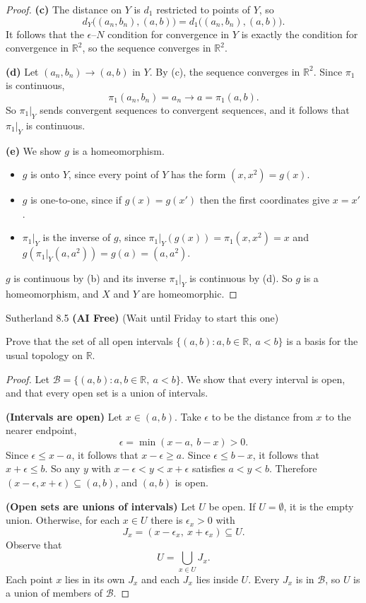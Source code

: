 \documentclass[minion]{homework}
\newcommand{\Reals}{\ensuremath{\mathbb R}}%
\begin{document}
\begin{problems}
\begin{proof}
\textbf{(c)} The distance on $Y$ is $d_1$ restricted to points of $Y$, so
\[
d_Y\big((a_n,b_n),(a,b)\big) = d_1\big((a_n,b_n),(a,b)\big).
\]
It follows that the $\epsilon$--$N$ condition for convergence in $Y$ is exactly the condition for convergence in $\Reals^2$, so the sequence converges in $\Reals^2$.

\textbf{(d)} Let $(a_n,b_n) \to (a,b)$ in $Y$. By (c), the sequence converges in $\Reals^2$. Since $\pi_1$ is continuous,
\[
\pi_1(a_n,b_n) = a_n \to a = \pi_1(a,b).
\]
So $\pi_1|_Y$ sends convergent sequences to convergent sequences, and it follows that $\pi_1|_Y$ is continuous.

\textbf{(e)} We show $g$ is a homeomorphism.
\begin{itemize}
  \item $g$ is onto $Y$, since every point of $Y$ has the form $(x,x^2) = g(x)$.
  \item $g$ is one-to-one, since if $g(x) = g(x')$ then the first coordinates give $x = x'$.
  \item $\pi_1|_Y$ is the inverse of $g$, since $\pi_1|_Y(g(x)) = \pi_1(x,x^2) = x$ and $g(\pi_1|_Y(a,a^2)) = g(a) = (a,a^2)$.
\end{itemize}
$g$ is continuous by (b) and its inverse $\pi_1|_Y$ is continuous by (d). So $g$ is a homeomorphism, and $X$ and $Y$ are homeomorphic.
\end{proof}

\problem Sutherland 8.5 \textbf{(AI Free)} (Wait until Friday to start this one)

Prove that the set of all open intervals $\{(a, b) : a, b \in \Reals,\ a < b\}$ is a basis for the usual topology on $\Reals$.

\begin{proof}
Let $\mathcal{B} = \{(a,b) : a, b \in \Reals,\ a < b\}$. We show that every interval is open, and that every open set is a union of intervals.

\textbf{(Intervals are open)} Let $x \in (a,b)$. Take $\epsilon$ to be the distance from $x$ to the nearer endpoint,
\[
\epsilon = \min(x - a,\ b - x) > 0.
\]
Since $\epsilon \le x - a$, it follows that $x - \epsilon \ge a$. Since $\epsilon \le b - x$, it follows that $x + \epsilon \le b$. So any $y$ with $x - \epsilon < y < x + \epsilon$ satisfies $a < y < b$. Therefore $(x - \epsilon, x + \epsilon) \subseteq (a,b)$, and $(a,b)$ is open.

\textbf{(Open sets are unions of intervals)} Let $U$ be open. If $U = \emptyset$, it is the empty union. Otherwise, for each $x \in U$ there is $\epsilon_x > 0$ with
\[
J_x = (x - \epsilon_x,\ x + \epsilon_x) \subseteq U.
\]
Observe that
\[
U = \bigcup_{x \in U} J_x .
\]
Each point $x$ lies in its own $J_x$ and each $J_x$ lies inside $U$. Every $J_x$ is in $\mathcal{B}$, so $U$ is a union of members of $\mathcal{B}$.
\end{proof}


\end{problems}
\end{document}
